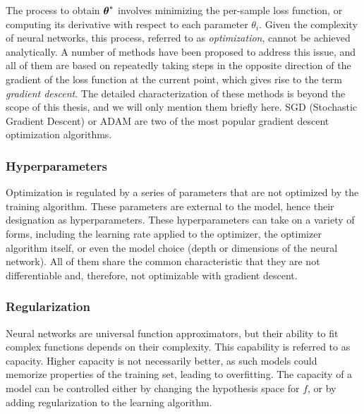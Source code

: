 The process to obtain $\boldsymbol{\theta}^*$ involves minimizing the per-sample loss function, or computing its derivative with respect to each parameter $\theta_i$. Given the complexity of neural networks, this process, referred to as \textit{optimization}, cannot be achieved analytically. A number of methods have been proposed to address this issue, and all of them are based on repeatedly taking steps in the opposite direction of the gradient of the loss function at the current point, which gives rise to the term \textit{gradient descent}. The detailed characterization of these methods is beyond the scope of this thesis, and we will only mention them briefly here. SGD (Stochastic Gradient Descent) or ADAM are two of the most popular gradient descent optimization algorithms.

\subsubsection{Hyperparameters}
Optimization is regulated by a series of parameters that are not optimized by the training algorithm. These parameters are external to the model, hence their designation as hyperparameters. These hyperparameters can take on a variety of forms, including the learning rate applied to the optimizer, the optimizer algorithm itself, or even the model choice (depth or dimensions of the neural network). All of them share the common characteristic that they are not differentiable and, therefore, not optimizable with gradient descent.

\subsubsection{Regularization}
Neural networks are universal function approximators, but their ability to fit complex functions depends on their complexity. This capability is referred to as capacity. Higher capacity is not necessarily better, as such models could memorize properties of the training set, leading to overfitting. The capacity of a model can be controlled either by changing the hypothesis space for $f$, or by adding regularization to the learning algorithm.

